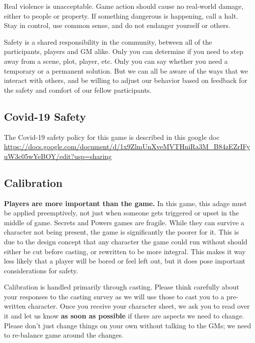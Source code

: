 \documentclass[sheet]{GL2020}
\begin{document}
Real violence is unacceptable. Game action should cause no real-world damage, either to people or property. If something dangerous is happening, call a halt. Stay in control, use common sense, and do not endanger yourself or others.

Safety is a shared responsibility in the community, between all of the participants, players and GM alike. Only you can determine if you need to step away from a scene, plot, player, etc. Only you can say whether you need a temporary or a permanent solution. But we can all be aware of the ways that we interact with others, and be willing to adjust our behavior based on feedback for the safety and comfort of our fellow participants.

\subsection{Covid-19 Safety}
The Covid-19 safety policy for this game is described in this google doc \url{https://docs.google.com/document/d/1x9ZlmUnXveMVTHniRa3M_B84zEZrIFyuW3c05wYeBOY/edit?usp=sharing}



\subsection{Calibration}
\textbf{Players are more important than the game.} In this game, this adage must be applied preemptively, not just when someone gets triggered or upset in the middle of game. Secrets and Powers games are fragile. While they can survive a character not being present, the game is significantly the poorer for it. This is due to the design concept that any character the game could run without should either be cut before casting, or rewritten to be more integral. This makes it way less likely that a player will be bored or feel left out, but it does pose important considerations for safety.

Calibration is handled primarily through casting. Please think carefully about your responses to the casting survey as we will use those to cast you to a pre-written character. Once you receive your character sheet, we ask you to read over it and let us know \textbf{as soon as possible} if there are aspects we need to change. Please don’t just change things on your own without talking to the GMs; we need to re-balance game around the changes.
\end{document}
